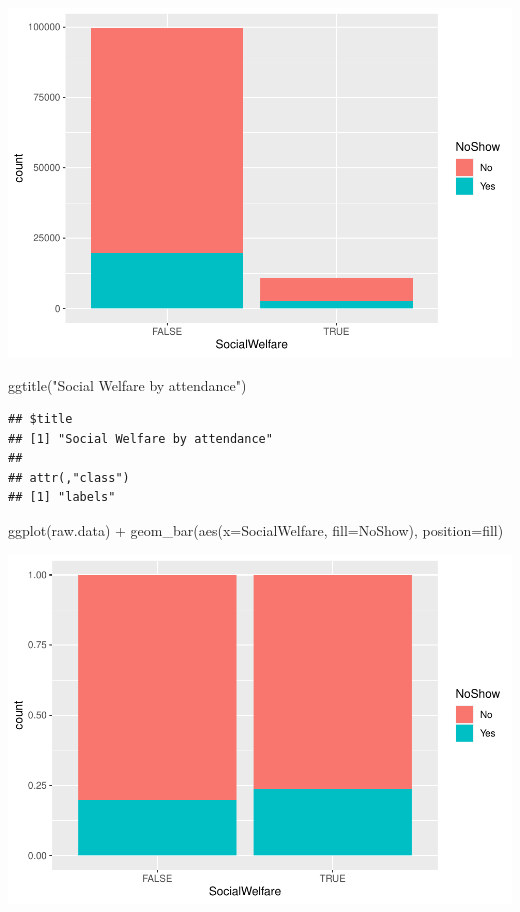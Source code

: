 \documentclass[
]{article}
\newenvironment{Shaded}{\begin{snugshade}}{\end{snugshade}}
\newcommand{\AttributeTok}[1]{\textcolor[rgb]{0.77,0.63,0.00}{#1}}
\newcommand{\FunctionTok}[1]{\textcolor[rgb]{0.00,0.00,0.00}{#1}}
\newcommand{\NormalTok}[1]{#1}
\newcommand{\SpecialCharTok}[1]{\textcolor[rgb]{0.00,0.00,0.00}{#1}}
\newcommand{\StringTok}[1]{\textcolor[rgb]{0.31,0.60,0.02}{#1}}
\begin{document}
\begin{center}\includegraphics{lab1_medical_databases_files/figure-latex/unnamed-chunk-13-1} \end{center}

\begin{Shaded}
\begin{Highlighting}[]
  \FunctionTok{ggtitle}\NormalTok{(}\StringTok{"Social Welfare by attendance"}\NormalTok{)}
\end{Highlighting}
\end{Shaded}

\begin{verbatim}
## $title
## [1] "Social Welfare by attendance"
## 
## attr(,"class")
## [1] "labels"
\end{verbatim}

\begin{Shaded}
\begin{Highlighting}[]
\FunctionTok{ggplot}\NormalTok{(raw.data) }\SpecialCharTok{+} 
  \FunctionTok{geom\_bar}\NormalTok{(}\FunctionTok{aes}\NormalTok{(}\AttributeTok{x=}\NormalTok{SocialWelfare, }\AttributeTok{fill=}\NormalTok{NoShow), }\AttributeTok{position=}\StringTok{\textquotesingle{}fill\textquotesingle{}}\NormalTok{)}
\end{Highlighting}
\end{Shaded}

\begin{center}\includegraphics{lab1_medical_databases_files/figure-latex/unnamed-chunk-13-2} \end{center}
\end{document}
